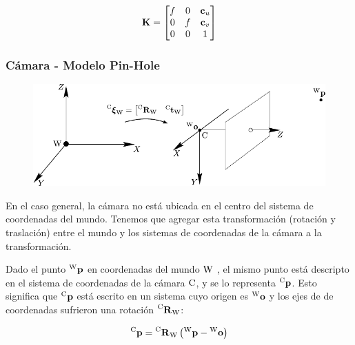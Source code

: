\begin{frame}
    \begin{equation*}
        \boldsymbol{\mathbf{K}}=
        \begin{bmatrix}f & 0 & \boldsymbol{\mathbf{c}}_{u}\\
            0 & f & \boldsymbol{\mathbf{c}}_{v}\\
            0 & 0 & 1
        \end{bmatrix}
    \end{equation*}
\end{frame}

\begin{frame}
    \frametitle{Cámara - Modelo Pin-Hole}
    
    \footnotesize
    
    \begin{figure}[!h]
        \includegraphics[width=0.6\columnwidth]{images/camera/camera_world_coordinate.pdf}
    \end{figure}
    
    En el caso general, la cámara no está ubicada en el centro del sistema de coordenadas del mundo. Tenemos que agregar esta transformación (rotación y traslación) entre el mundo y los sistemas de coordenadas de la cámara a la transformación.
    
    Dado el punto $\prescript{\mathrm{\mathrm{W}}}{}{\boldsymbol{\mathbf{p}}}$ en coordenadas del mundo $\mathrm{W}$ , el mismo punto está descripto en el sistema de coordenadas de la cámara $\mathrm{C}$, y se lo representa $\prescript{\mathrm{\mathrm{C}}}{}{\boldsymbol{\mathbf{p}}}$. Esto significa que $\prescript{\mathrm{\mathrm{C}}}{}{\boldsymbol{\mathbf{p}}}$ está escrito en un sistema cuyo origen es $\prescript{\mathrm{\mathrm{W}}}{}{\boldsymbol{\mathbf{o}}}$ y los ejes de de coordenadas sufrieron una rotación $\prescript{\mathrm{\mathrm{C}}}{}{{\boldsymbol{\mathbf{R}}}_\mathrm{\mathrm{W}}}$:
    
    \begin{equation*}
        \prescript{\mathrm{\mathrm{C}}}{}{\boldsymbol{\mathbf{p}}} = \prescript{\mathrm{\mathrm{C}}}{}{{\boldsymbol{\mathbf{R}}}_\mathrm{\mathrm{W}}} \left( \prescript{\mathrm{\mathrm{W}}}{}{\boldsymbol{\mathbf{p}}} - \prescript{\mathrm{\mathrm{W}}}{}{\boldsymbol{\mathbf{o}}} \right)
    \end{equation*}

\end{frame}

